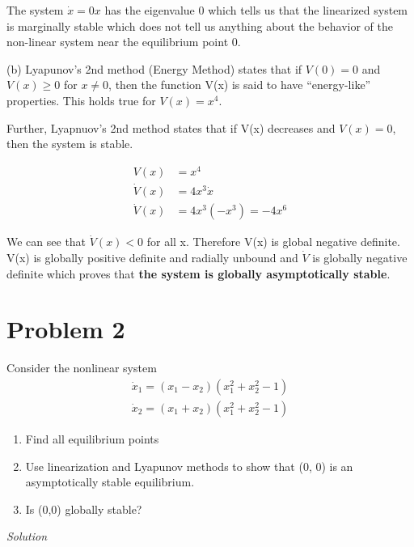 \documentclass{article}
\begin{document}
  The system $\dot{x} = 0x$ has the eigenvalue 0 which tells us that the
  linearized system is marginally stable which does not tell us anything about
  the behavior of the non-linear system near the equilibrium point 0. \newpage
    
  \noindent (b) Lyapunov's 2nd method (Energy Method) states that if $V(0)=0$  and $V(x)
  \geq 0$ for $x \neq 0$, then the function V(x) is said to have ``energy-like'' properties.
  This holds true for $V(x)=x^4$.

  Further, Lyapnuov's 2nd method states that if V(x) decreases and $V(x)=0$, then the system is stable.

  \begin{align*}
    V(x) &= x^4 \\
    \dot{V}(x) &= 4x^3\dot{x} \\
    \dot{V}(x) &= 4x^3(-x^3) = -4x^6
  \end{align*}

  We can see that $\dot{V}(x) < 0$ for all x. Therefore V(x) is global negative
  definite. V(x) is globally positive definite and radially unbound and
  $\dot{V}$ is globally negative definite which proves that \textbf{the system
    is globally asymptotically stable}. \newpage


  \section{Problem 2}

  Consider the nonlinear system
  \begin{align*}
    \dot{x}_1 = (x_1 - x_2)(x_1^2 + x_2^2 -1) \\
    \dot{x}_2 = (x_1 + x_2)(x_1^2 + x_2^2 -1)
  \end{align*}

  \begin{enumerate}[label=(\alph*)]
    \item Find all equilibrium points
    \item Use linearization and Lyapunov methods to show that (0, \hspace{0.5mm}0) is an
      asymptotically stable equilibrium.
    \item Is (0,0) globally stable?
  \end{enumerate}
    

  \vspace{3mm}
  
  \noindent \textit{Solution} \newline \newline
\end{document}
